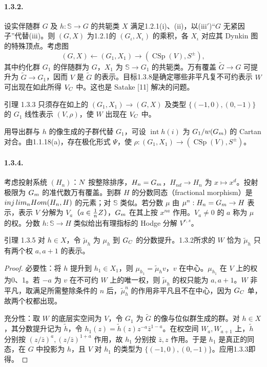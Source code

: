 \paragraph*{1.3.2.} 设实伴随群 $G$ 及 $h:\mathbb S\to G$ 的共轭类 $X$ 满足1.2.1(i)、(ii)，以(iii$'$)“$G$ 无紧因子”代替(iii)。则 $(G,X)$ 为1.2.1的 $(G_\iota,X_\iota)$ 的乘积，各 $X_\iota$ 对应其 Dynkin 图的特殊顶点。考虑图
\[
 (G,X)\longleftarrow(G_1,X_1)\longrightarrow(\operatorname{CSp}(V),S^\pm),
\]
其中约化群 $G_1$ 的伴随群为 $G$，$X_1$ 为 $\mathbb S\to G_1$ 的共轭类。万有覆盖 $\widetilde G\to G$ 可提升为 $\widetilde G\to G_1$，因而 $V$ 是 $\widetilde G$ 的表示。目标1.3.8是确定哪些非平凡复不可约表示 $W$ 可出现在如此所得 $V_{C}$ 中。这也是 Satake [11] 解决的问题。
\begin{originaltheorem}{引理 1.3.3}
只须存在如上的 $(G_1,X_1)\to(G,X)$ 及类型 $\{(-1,0),(0,-1)\}$ 的 $G_1$ 线性表示 $(V,\rho)$，使 $W$ 出现在 $V_{C}$ 中。
\end{originaltheorem}
用导出群与 $h$ 的像生成的子群代替 $G_1$，可设 $\operatorname{int}h(i)$ 为 $G_1/w(G_{m})$ 的 Cartan 对合。由1.1.18(a)，存在极化形式 $\Psi$，使 $\rho:(G_1,X_1)\to(\operatorname{CSp}(V),S^\pm)$。
\paragraph*{1.3.4.} 考虑投射系统 $(H_n)$：$N$ 按整除排序，$H_n=G_{m}$，$H_{nd}\to H_n$ 为 $x\mapsto x^d$。投射极限为 $G_{m}$ 的准代数万有覆盖。到群 $H$ 的分数同态（fractional morphism）是 $inj\,lim_nHom(H_n,H)$ 的元素；对 $\mathbb S$ 类似。若分数 $\mu$ 由 $\mu^n:H_n=G_{m}\to H$ 表示，表示 $V$ 分解为 $V_a$（$a\in\frac1nZ$），$G_{m}$ 在其上按 $x^{na}$ 作用。$V_a\ne0$ 的 $a$ 称为 $\mu$ 的权。分数 $h:\mathbb S\to H$ 类似给出有理指标的 Hodge 分解 $V^{r,s}$。
\begin{originaltheorem}{引理 1.3.5}
对 $h\in X$，令 $\widetilde\mu_h$ 为 $\mu_h$ 到 $G_{C}$ 的分数提升。1.3.2所求的 $W$ 恰为 $\widetilde\mu_h$ 只有两个权 $a,a+1$ 的表示。
\end{originaltheorem}
\begin{proof}
必要性：将 $h$ 提升到 $h_1\in X_1$，则 $\mu_{h_1}=\widetilde\mu_hv$，$v$ 在中心。$\mu_{h_1}$ 在 $V$ 上的权为0、1。若 $-a$ 为 $v$ 在不可约 $W$ 上的唯一权，则 $\widetilde\mu_h$ 的权只能为 $a,a+1$。$W$ 非平凡，取满足所需整除条件的 $n$ 后，$\widetilde\mu_h^n$ 的作用非平凡且不在中心，因为 $G_{C}$ 单，故两个权都出现。

充分性：取 $W$ 的底层实空间为 $V$，令 $G_1$ 为 $\widetilde G$ 的像与位似群生成的群。对 $h\in X$，其分数提升记为 $\widetilde h$，令 $h_1(z)=\widetilde h(z)z^{-a}\bar z^{1-a}$。在权空间 $W_a,W_{a+1}$ 上，$\widetilde h$ 分别按 $(z/\bar z)^a,(z/\bar z)^{1+a}$ 作用，故 $h_1$ 分别按 $\bar z,z$ 作用。于是 $h_1$ 是真正的同态，在 $G$ 中投影为 $h$，且 $V$ 对 $h_1$ 的类型为 $\{(-1,0),(0,-1)\}$。应用1.3.3即得。
\end{proof}
